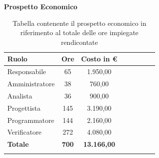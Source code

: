 \documentclass[../piano_di_progetto.tex]{subfiles}
\begin{document}
\textbf{Prospetto Economico}

\begin{center}
	\begin{longtable}{|l|c|c|c|c|c|c|c|}
		\hline
		\rowcolor{lightgray}
		\textbf{Ruolo} & \textbf{Ore} & \textbf{Costo in €}\\

		\hline
		Responsabile & 65 & 1.950,00 \\
		\hline
		Amministratore & 38 & 760,00 \\
		\hline
		Analista & 36 & 900,00 \\
		\hline
		Progettista & 145 & 3.190,00 \\
		\hline
		Programmatore & 144 & 2.160,00 \\
		\hline
		Verificatore & 272 & 4.080,00 \\
		\hline
		\textbf{Totale} & \textbf{700} & \textbf{13.166,00}\\
		\hline
		\caption{Tabella contenente il prospetto economico in riferimento al totale delle ore impiegate rendicontate}
	\end{longtable}
\end{center}
\end{document}
